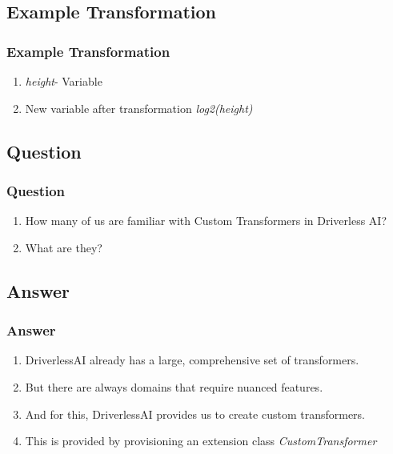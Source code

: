 \documentclass[11pt,
aspectratio=169,
hyperref={colorlinks}
]{beamer}
\begin{document}
\subsection{Example Transformation}
\begin{frame}[fragile]
        \frametitle{Example Transformation}
        \begin{enumerate}
                \item \textit{height}- Variable
                \item New variable after transformation \textit{log2(height)}
        \end{enumerate}
\end{frame}
\subsection{Question}
\begin{frame}
        \frametitle{Question}
        \begin{enumerate}
                \item How many of us are familiar with Custom Transformers in Driverless AI?
                \item What are they?
        \end{enumerate}
\end{frame}
\subsection{Answer}
\begin{frame}
        \frametitle{Answer}
        \begin{enumerate}
                \item DriverlessAI already has a large, comprehensive set of transformers. 
                \item But there are always domains that require nuanced features. 
                \item And for this, DriverlessAI provides us to create custom transformers. 
                \item This is provided by provisioning an extension class \textit{CustomTransformer}
        \end{enumerate}
\end{frame}
\end{document}
